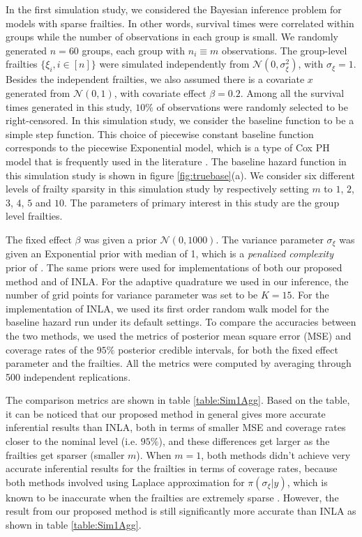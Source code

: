 \documentclass[ba]{imsart}
\begin{document}
In the first simulation study, we considered the Bayesian inference problem for models with sparse frailties. In other words, survival times were correlated within groups while the number of observations in each group is small. We randomly generated $n = 60$ groups, each group with $n_i \equiv m$ observations. The group-level frailties $\{\xi_i, i\in [n] \}$ were simulated independently from $\mathcal{N}(0,\sigma_\xi^{2})$, with $\sigma_{\xi} = 1$. Besides the independent frailties, we also assumed there is a covariate $x$ generated from $\mathcal{N}(0,1)$, with covariate effect $\beta = 0.2$. Among all the survival times generated in this study, $10\%$ of observations were randomly selected to be right-censored. In this simulation study, we consider the baseline function to be a simple step function. This choice of piecewise constant baseline function corresponds to the piecewise Exponential model, which is a type of Cox PH model that is frequently used in the literature \citep{piecewiseExp}.
The baseline hazard function in this simulation study is shown in figure \ref{fig:truebase}(a). We consider six different levels of frailty sparsity in this simulation study by respectively setting $m$ to $1$, $2$, $3$, $4$, $5$ and $10$. The parameters of primary interest in this study are the group level frailties.

The fixed effect $\beta$ was given a prior $\mathcal{N}(0,1000)$. The variance parameter $\sigma_\xi$ was given an Exponential prior with median of 1, which is a \emph{penalized complexity} prior of \cite{pcprior}. The same priors were used for implementations of both our proposed method and of INLA. For the adaptive quadrature we used in our inference, the number of grid points for variance parameter was set to be $K = 15$. For the implementation of INLA, we used its first order random walk model for the baseline hazard run under its default settings. To compare the accuracies between the two methods, we used the metrics of posterior mean square error (MSE) and coverage rates of the $95\%$ posterior credible intervals, for both the fixed effect parameter and the frailties. All the metrics were computed by averaging through 500 independent replications.

The comparison metrics are shown in table \ref{table:Sim1Agg}. Based on the table, it can be noticed that our proposed method in general gives more accurate inferential results than INLA, both in terms of smaller MSE and coverage rates closer to the nominal level (i.e. $95\%$), and these differences get larger as the frailties get sparser (smaller $m$). When $m = 1$, both methods didn't achieve very accurate inferential results for the frailties in terms of coverage rates, because both methods involved using Laplace approximation for $\pi(\sigma_\xi|y)$, which is known to be inaccurate when the frailties are extremely sparse \citep{Ogden2013ASR}. However, the result from our proposed method is still significantly more accurate than INLA as shown in table \ref{table:Sim1Agg}.
\end{document}
